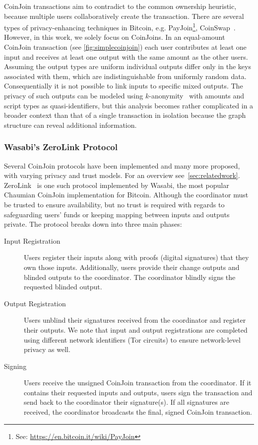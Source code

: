 \documentclass[a4paper]{article}
\begin{document}
CoinJoin transactions aim to contradict to the common ownership heuristic, because multiple users collaboratively create the transaction. There are several types of privacy-enhancing techniques in Bitcoin, e.g. PayJoin\footnote{See: \url{https://en.bitcoin.it/wiki/PayJoin}}, CoinSwap~\cite{belcher2020design}. However, in this work, we solely focus on CoinJoins. In an equal-amount CoinJoin transaction (see \cref{fig:simplecoinjoin}) each user contributes at least one input and receives at least one output with the same amount as the other users. Assuming the output types are uniform individual outputs differ only in the keys associated with them, which are indistinguishable from uniformly random data. Consequentially it is not possible to link inputs to specific mixed outputs. The privacy of such outputs can be modeled using $k$-anonymity~\cite{sweeney2002k} with amounts and script types as quasi-identifiers, but this analysis becomes rather complicated in a broader context than that of a single transaction in isolation because the graph structure can reveal additional information.

\subsubsection{Wasabi's ZeroLink Protocol}

Several CoinJoin protocols have been implemented and many more proposed, with varying privacy and trust models. For an overview see~\cref{sec:relatedwork}. ZeroLink~\cite{zerolink} is one such protocol implemented by Wasabi, the most popular Chaumian CoinJoin implementation for Bitcoin. Although the coordinator must be trusted to ensure availability, but no trust is required with regards to safeguarding users' funds or keeping mapping between inputs and outputs private. The protocol breaks down into three main phases:

\begin{description}
 \item[Input Registration] Users register their inputs along with proofs (digital signatures) that they own those inputs. Additionally, users provide their change outputs and blinded outputs to the coordinator. The coordinator blindly signs the requested blinded output.
 \item[Output Registration] Users unblind their signatures received from the coordinator and register their outputs. We note that input and output registrations are completed using different network identifiers (Tor circuits) to ensure network-level privacy as well.
 \item[Signing] Users receive the unsigned CoinJoin transaction from the coordinator. If it contains their requested inputs and outputs, users sign the transaction and send back to the coordinator their signature(s). If all signatures are received, the coordinator broadcasts the final, signed CoinJoin transaction.
\end{description}
\end{document}
